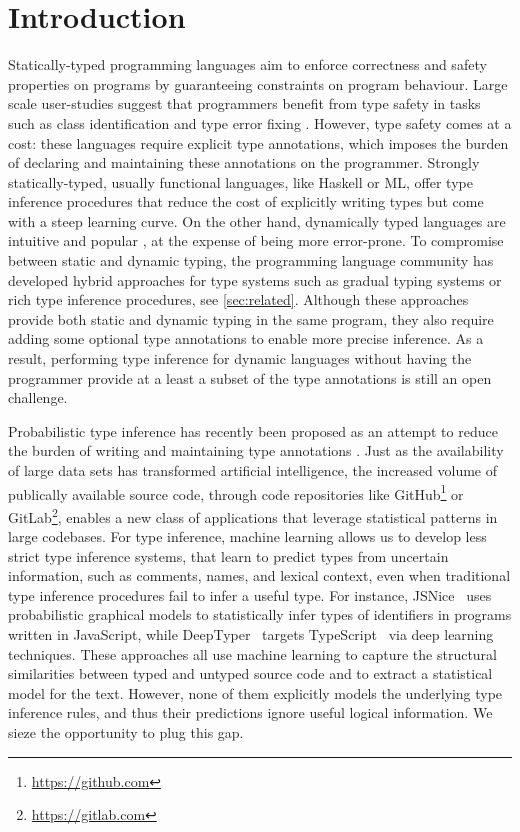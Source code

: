 \documentclass[sigplan,10pt,anonymous]{acmart} %
\theoremstyle{plain}
\theoremstyle{remark}
\theoremstyle{definition}
\begin{document}
\section{Introduction}
Statically-typed programming languages aim to enforce correctness and safety  properties
on programs by guaranteeing constraints on program behaviour.
Large scale user-studies
suggest that programmers
benefit from type safety in tasks
such as class identification and type error fixing  \citep{hanenberg14}.
However, type safety comes at a cost: these languages require explicit type annotations,
which imposes the burden of declaring and maintaining these annotations on the programmer.
Strongly statically-typed, usually functional languages, like Haskell or ML,
offer type inference procedures that reduce
the cost of explicitly writing types but come with
a steep learning curve.
On the other hand, dynamically typed languages are intuitive
and popular \cite{meyerovich12}, at the expense of being more error-prone.
To compromise between static and dynamic typing,
the programming language community has developed hybrid approaches for type systems
such as gradual typing systems \cite{siek06} or rich type inference procedures, see \cref{sec:related}.
Although these approaches provide both static and dynamic typing in the same program,
they also require adding some optional type annotations to enable more precise inference.
As a result, performing type inference for dynamic
languages without having the programmer provide at a least a subset of
the type annotations is still an open challenge.

Probabilistic type inference
has recently been proposed as an attempt to reduce the burden
of writing and maintaining type
annotations \cite{raychev15,xu16,hellendoorn18}.
Just as the availability of large data sets has transformed artificial intelligence,
the increased volume of publically available source code, through
code repositories like GitHub\footnote{\href{https://github.com}{https://github.com}}
or GitLab\footnote{\href{https://gitlab.com}{https://gitlab.com}},
enables a new class of applications that leverage statistical
patterns in large codebases.
For type inference, machine learning
allows us to develop less strict type inference systems,
that learn to predict types from uncertain information,
such as comments, names, and lexical context,
even when traditional type inference procedures
fail to infer a useful type.
For instance,
JSNice~\cite{raychev15} uses probabilistic graphical models to statistically infer types of identifiers in programs written in JavaScript, while DeepTyper~\cite{hellendoorn18} targets TypeScript~\cite{typescript} via deep learning techniques.
These approaches all use machine learning to capture the structural
similarities between typed and untyped source code and to extract a statistical model for
the text. However, none of them explicitly models the underlying
type inference rules, and thus their predictions ignore useful logical information.
We sieze the opportunity to plug this gap.
\end{document}
